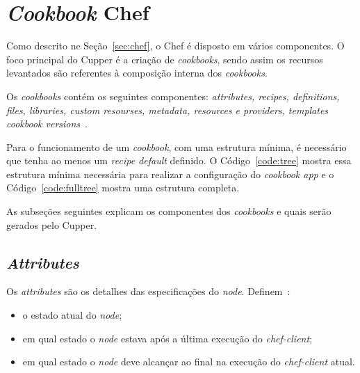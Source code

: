 \section{\textit{Cookbook} Chef}
\label{sec:lev-rec}

Como descrito ne Seção~\ref{sec:chef}, o Chef é disposto em vários
componentes. O foco principal do Cupper é a criação de \textit{cookbooks},
sendo assim os recursos levantados são referentes à composição interna
dos \textit{cookbooks}.

Os \textit{cookbooks} contém os seguintes componentes: \textit{attributes, recipes, definitions,
files, libraries, custom resourses, metadata, resources e providers, templates
cookbook versions}~\cite{chefdoc:2016}.

Para o funcionamento de um \textit{cookbook}, com uma estrutura mínima, é necessário que tenha
ao menos um \textit{recipe default} definido. O Código~\ref{code:tree} mostra essa
estrutura mínima necessária para realizar a configuração do \textit{cookbook app} e o Código~\ref{code:fulltree} mostra uma estrutura completa.

\noindent\begin{minipage}{.45\textwidth}
  
\end{minipage}\hfill
\noindent\begin{minipage}{.45\textwidth}
  
\end{minipage}

As subseções seguintes explicam os componentes dos \textit{cookbooks} e quais serão gerados
pelo Cupper.

\subsection{\textit{Attributes}}
\label{sec:lev-rec-att}

Os \textit{attributes} são os detalhes das especificações do \textit{node}. Definem~\cite{chefdoc:2016}:

\begin{itemize}
  \item o estado atual do \textit{node};
  \item em qual estado o \textit{node} estava após a última execução do \textit{chef-client};
  \item em qual estado o \textit{node} deve alcançar ao final na execução do \textit{chef-client} atual.
\end{itemize}

